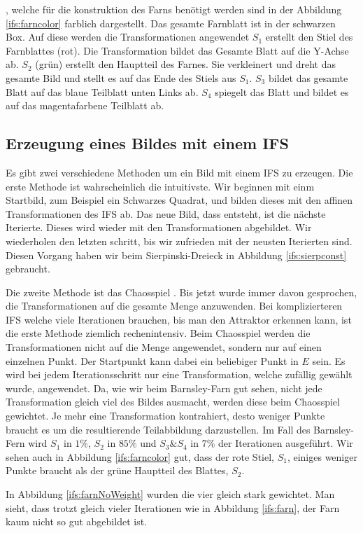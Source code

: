 , welche für die konstruktion des Farns benötigt werden sind in der Abbildung \ref{ifs:farncolor} farblich dargestellt.
Das gesamte Farnblatt ist in der schwarzen Box.
Auf diese werden die Transformationen angewendet
$S_1$ erstellt den Stiel des Farnblattes (rot).
Die Transformation bildet das Gesamte Blatt auf die Y-Achse ab.
$S_2$ (grün) erstellt den Hauptteil des Farnes. 
Sie verkleinert und dreht das gesamte Bild und stellt es auf das Ende des Stiels aus $S_1$.
$S_3$ bildet das gesamte Blatt auf das blaue Teilblatt unten Links ab.
$S_4$ spiegelt das Blatt und bildet es auf das magentafarbene Teilblatt ab.  
\subsection{Erzeugung eines Bildes mit einem IFS}
Es gibt zwei verschiedene Methoden um ein Bild mit einem IFS zu erzeugen.
Die erste Methode ist wahrscheinlich die intuitivste. 
Wir beginnen mit einm Startbild, zum Beispiel ein Schwarzes Quadrat, und bilden dieses mit den affinen Transformationen des IFS ab.
Das neue Bild, dass entsteht, ist die nächste Iterierte.
Dieses wird wieder mit den Transformationen abgebildet.
Wir wiederholen den letzten schritt, bis wir zufrieden mit der neusten Iterierten sind.
Diesen Vorgang haben wir beim Sierpinski-Dreieck in Abbildung \ref{ifs:sierpconst} gebraucht.


Die zweite Methode ist das Chaosspiel \cite{ifs:chaos}. 
Bis jetzt wurde immer davon gesprochen, die Transformationen auf die gesamte Menge anzuwenden.
Bei komplizierteren IFS welche viele Iterationen brauchen, bis man den Attraktor erkennen kann, ist die erste Methode ziemlich rechenintensiv.
Beim Chaosspiel werden die Transformationen nicht auf die Menge angewendet, sondern nur auf einen einzelnen Punkt.
Der Startpunkt kann dabei ein beliebiger Punkt in $E$ sein.
Es wird bei jedem Iterationsschritt nur eine Transformation, welche zufällig gewählt wurde, angewendet.
Da, wie wir beim Barnsley-Farn gut sehen, nicht jede Transformation gleich viel des Bildes ausmacht, werden diese beim Chaosspiel gewichtet.
Je mehr eine Transformation kontrahiert, desto weniger Punkte braucht es um die resultierende Teilabbildung darzustellen.
Im Fall des Barnsley-Fern wird $S_1$ in $1\%$, $S_2$ in $85\%$ und $S_3 \& S_4$ in $7\%$ der Iterationen ausgeführt.
Wir sehen auch in Abbildung \ref{ifs:farncolor} gut, dass der rote Stiel, $S_1$, einiges weniger Punkte braucht als der grüne Hauptteil des Blattes, $S_2$.

In Abbildung \ref{ifs:farnNoWeight} wurden die vier gleich stark gewichtet.
Man sieht, dass trotzt gleich vieler Iterationen wie in Abbildung \ref{ifs:farn}, der Farn kaum nicht so gut abgebildet ist.




